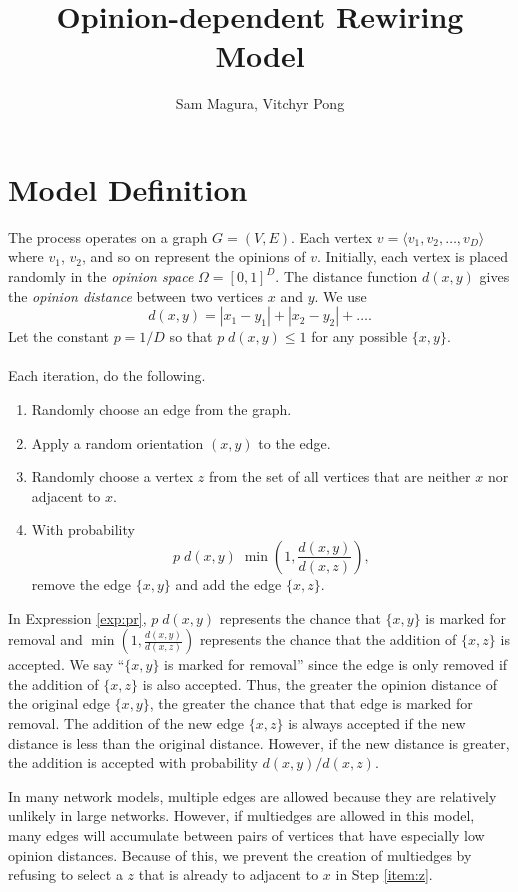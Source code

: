 \documentclass[a4paper,10pt]{article}
\title{Opinion-dependent Rewiring Model}
\author{Sam Magura, Vitchyr Pong}
\begin{document}
\maketitle
\section{Model Definition}
The process operates on a graph $G = (V, E)$. Each vertex $v = \langle v_1, v_2, \ldots, v_D \rangle$ where $v_1$, $v_2$, and so on represent the opinions of $v$. Initially, each vertex is placed randomly in the \emph{opinion space} $\Omega = [0, 1]^D$. The distance function $d(x, y)$ gives the \emph{opinion distance} between two vertices $x$ and $y$. We use
\begin{equation}
 d(x, y) = |x_1 - y_1| + |x_2 - y_2| + \ldots.
\end{equation}
Let the constant $p = 1 / D$ so that $p \; d(x, y) \leq 1$ for any possible $\{x, y\}$.  
\\\\Each iteration, do the following.
\begin{enumerate}
 \item Randomly choose an edge from the graph.
 \item Apply a random orientation $(x, y)$ to the edge.
 \item \label{item:z} Randomly choose a vertex $z$ from the set of all vertices that are neither $x$ nor adjacent to $x$.
 \item With probability
 \begin{equation}
 \label{exp:pr}
  p \; d(x, y) \; \min\left(1, \frac{d(x, y)}{d(x, z)}\right), 
 \end{equation}
remove the edge $\{x, y\}$ and add the edge $\{x, z\}$. 
\end{enumerate}
In Expression \ref{exp:pr}, $p \; d(x, y)$ represents the chance that $\{x, y\}$ is marked for removal and $\min(1, \frac{d(x, y)}{d(x, z)})$ represents the chance that the addition of $\{x, z\}$ is accepted. We say ``$\{x, y\}$ is marked for removal'' since the edge is only removed if the addition of $\{x, z\}$ is also accepted. Thus, the greater the opinion distance of the original edge $\{x, y\}$, the greater the chance that that edge is marked for removal. The addition of the new edge $\{x, z\}$ is always accepted if the new distance is less than the original distance. However, if the new distance is greater, the addition is accepted with probability $d(x, y) / d(x, z).$

In many network models, multiple edges are allowed because they are relatively unlikely in large networks. However, if multiedges are allowed in this model, many edges will accumulate between pairs of vertices that have especially low opinion distances. Because of this, we prevent the creation of multiedges by refusing to select a $z$ that is already to adjacent to $x$ in Step \ref{item:z}.
\end{document}
